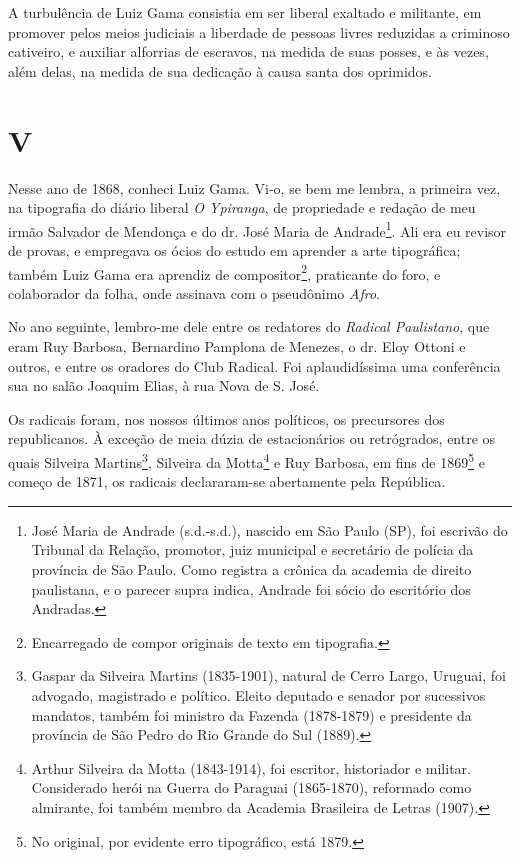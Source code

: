 A turbulência de Luiz Gama consistia em ser liberal exaltado e
militante, em promover pelos meios judiciais a liberdade de pessoas
livres reduzidas a criminoso cativeiro, e auxiliar alforrias de
escravos, na medida de suas posses, e às vezes, além delas, na medida de
sua dedicação à causa santa dos oprimidos.

\section*{V}

Nesse ano de 1868, conheci Luiz Gama. Vi-o, se bem me lembra, a primeira
vez, na tipografia do diário liberal \emph{O Ypiranga}, de propriedade e
redação de meu irmão Salvador de Mendonça e do dr. José Maria de
Andrade\footnote{José Maria de Andrade (s.d.-s.d.), nascido em São
  Paulo (SP), foi escrivão do Tribunal da Relação, promotor, juiz
  municipal e secretário de polícia da província de São Paulo. Como
  registra a crônica da academia de direito paulistana, e o parecer
  supra indica, Andrade foi sócio do escritório dos Andradas.}. Ali era
eu revisor de provas, e empregava os ócios do estudo em aprender a arte
tipográfica; também Luiz Gama era aprendiz de compositor\footnote{
  Encarregado de compor originais de texto em tipografia.}, praticante
do foro, e colaborador da folha, onde assinava com o pseudônimo
\emph{Afro}.

No ano seguinte, lembro-me dele entre os redatores do \emph{Radical
Paulistano}, que eram Ruy Barbosa, Bernardino Pamplona de Menezes, o dr.
Eloy Ottoni e outros, e entre os oradores do Club Radical. Foi
aplaudidíssima uma conferência sua no salão Joaquim Elias, à rua Nova de
S. José.

Os radicais foram, nos nossos últimos anos políticos, os precursores dos
republicanos. À exceção de meia dúzia de estacionários ou retrógrados,
entre os quais Silveira Martins\footnote{Gaspar da Silveira Martins
  (1835-1901), natural de Cerro Largo, Uruguai, foi advogado, magistrado
  e político. Eleito deputado e senador por sucessivos mandatos, também
  foi ministro da Fazenda (1878-1879) e presidente da província de São
  Pedro do Rio Grande do Sul (1889).}, Silveira da Motta\footnote{
  Arthur Silveira da Motta (1843-1914), foi escritor, historiador e
  militar. Considerado herói na Guerra do Paraguai (1865-1870),
  reformado como almirante, foi também membro da Academia Brasileira de
  Letras (1907).} e Ruy Barbosa, em fins de 1869\footnote{No original,
  por evidente erro tipográfico, está 1879.} e começo de 1871, os
radicais declararam-se abertamente pela República.

